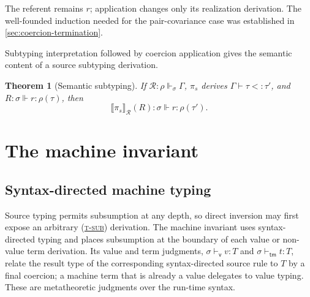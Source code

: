 \documentclass[acmsmall,screen,nonacm]{acmart}
\newtheorem{theorem}{Theorem}
\newcommand{\ruleref}[1]{%
  \textsc{(\hyperref[rule:#1]{#1})}}
\newcommand{\realizes}{\Vdash}
\newcommand{\compilepi}[2]{\llbracket #2\rrbracket_{#1}}
\newcommand{\action}[2]{#1(#2)}
\begin{document}
The referent remains \(r\); application changes only its realization
derivation. The well-founded induction needed for the pair-covariance case was established in
\cref{sec:coercion-termination}.

Subtyping interpretation followed by coercion application gives the semantic
content of a source subtyping derivation.

\begin{theorem}[Semantic subtyping]
\label{thm:semantic-subtyping}
If \(\mathcal R:\rho\realizes_\sigma\Gamma\),
\(\pi_s\) derives \(\Gamma\vdash\tau<:\tau'\), and
\(R:\sigma\realizes r:\rho(\tau)\), then
\[
  \action{\compilepi{\mathcal R}{\pi_s}}{R}:
  \sigma\realizes r:\rho(\tau').
\]
\end{theorem}

\section{The machine invariant}
\label{sec:invariant}

\subsection{Syntax-directed machine typing}

Source typing permits subsumption at any depth, so direct inversion may first
expose an arbitrary \ruleref{t-sub} derivation. The machine invariant uses
syntax-directed typing and places subsumption at the boundary of each value
or non-value term derivation. Its value and term judgments,
\(\sigma\vdash_{\mathsf v}v:T\) and
\(\sigma\vdash_{\mathsf{tm}}t:T\), relate the result type of the
corresponding syntax-directed source rule to \(T\) by a final coercion;
a machine term that is already a value delegates to value typing. These are
metatheoretic judgments over the run-time syntax.
\end{document}
